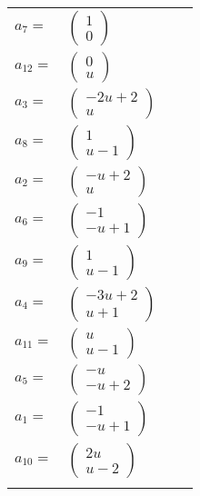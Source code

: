 \documentclass[1p]{elsarticle_modified}
\theoremstyle{definition}
\begin{document}
\begin{tabular}{m{7pt} m{180pt} m{7pt} m{180pt} }
\flushright $a_{7}=$&$\begin{pmatrix}1\\0\end{pmatrix}$ \\
\flushright $a_{12}=$&$\begin{pmatrix}0\\u\end{pmatrix}$ \\
\flushright $a_{3}=$&$\begin{pmatrix}-2 u+2\\u\end{pmatrix}$ \\
\flushright $a_{8}=$&$\begin{pmatrix}1\\u-1\end{pmatrix}$ \\
\flushright $a_{2}=$&$\begin{pmatrix}- u+2\\u\end{pmatrix}$ \\
\flushright $a_{6}=$&$\begin{pmatrix}-1\\- u+1\end{pmatrix}$ \\
\flushright $a_{9}=$&$\begin{pmatrix}1\\u-1\end{pmatrix}$ \\
\flushright $a_{4}=$&$\begin{pmatrix}-3 u+2\\u+1\end{pmatrix}$ \\
\flushright $a_{11}=$&$\begin{pmatrix}u\\u-1\end{pmatrix}$ \\
\flushright $a_{5}=$&$\begin{pmatrix}- u\\- u+2\end{pmatrix}$ \\
\flushright $a_{1}=$&$\begin{pmatrix}-1\\- u+1\end{pmatrix}$ \\
\flushright $a_{10}=$&$\begin{pmatrix}2 u\\u-2\end{pmatrix}$\\&\end{tabular}
\end{document}
